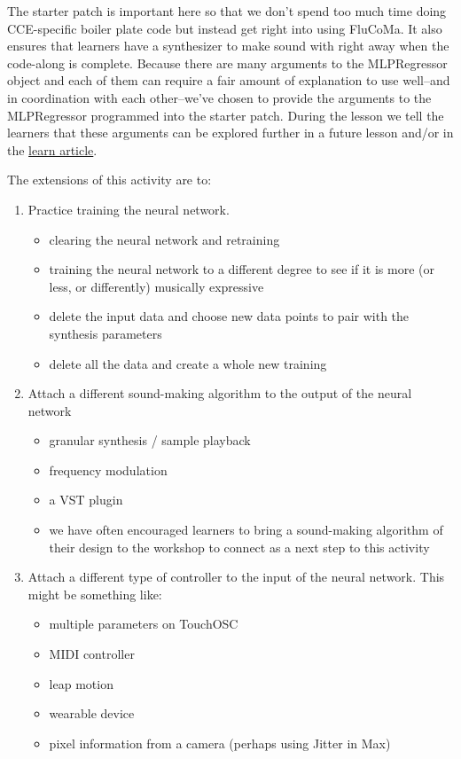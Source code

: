 \documentclass{article}
\providecommand{\tightlist}{%
  \setlength{\itemsep}{0pt}\setlength{\parskip}{0pt}}
\begin{document}
The starter patch is important here so that we don't spend too
much time doing CCE-specific boiler plate code but instead get right
into using FluCoMa. It also ensures that learners have a synthesizer to
make sound with right away when the code-along is complete. Because
there are many arguments to the MLPRegressor object and each of them can
require a fair amount of explanation to use well--and in coordination
with each other--we've chosen to provide the arguments to the
MLPRegressor programmed into the starter patch. During the lesson we
tell the learners that these arguments can be explored further in a
future lesson and/or in the
\href{https://learn.flucoma.org/learn/mlp-parameters/}{learn article}.

The extensions of this activity are to:

\begin{enumerate}
\def\labelenumi{\arabic{enumi}.}
\tightlist
\item
  Practice training the neural network.

  \begin{itemize}
  \tightlist
  \item
    clearing the neural network and retraining
  \item
    training the neural network to a different degree to see if it is more (or less, or differently) musically
    expressive
  \item
    delete the input data and choose new data points to pair with the
    synthesis parameters
  \item
    delete all the data and create a whole new training
  \end{itemize}
\item
  Attach a different sound-making algorithm to the output of the neural
  network

  \begin{itemize}
  \tightlist
  \item
    granular synthesis / sample playback
  \item
    frequency modulation
  \item
    a VST plugin
  \item
    we have often encouraged learners to bring a sound-making algorithm
    of their design to the workshop to connect as a next step to this
    activity
  \end{itemize}
\item
  Attach a different type of controller to the input of the neural
  network. This might be something like:

  \begin{itemize}
  \tightlist
  \item
    multiple parameters on TouchOSC
  \item
    MIDI controller
  \item
    leap motion
  \item
    wearable device
  \item
    pixel information from a camera (perhaps using Jitter in Max)
  \end{itemize}
\end{enumerate}
\end{document}
